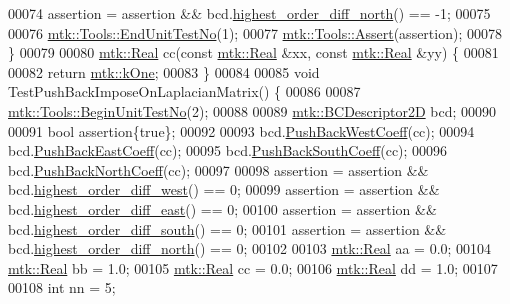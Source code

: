 \begin{DoxyCode}
00074   assertion = assertion && bcd.\hyperlink{classmtk_1_1BCDescriptor2D_a87c5f2449247d65ea07784ba2ec61bc7}{highest\_order\_diff\_north}() == -1;
00075 
00076   \hyperlink{classmtk_1_1Tools_aba67d9dc35c9c1c49430fcc9ea035e03}{mtk::Tools::EndUnitTestNo}(1);
00077   \hyperlink{classmtk_1_1Tools_ac6804df469c94ab6a796fb64f1e44a89}{mtk::Tools::Assert}(assertion);
00078 \}
00079 
00080 \hyperlink{group__c01-roots_gac080bbbf5cbb5502c9f00405f894857d}{mtk::Real} cc(\textcolor{keyword}{const} \hyperlink{group__c01-roots_gac080bbbf5cbb5502c9f00405f894857d}{mtk::Real} &xx, \textcolor{keyword}{const} \hyperlink{group__c01-roots_gac080bbbf5cbb5502c9f00405f894857d}{mtk::Real} &yy) \{
00081 
00082   \textcolor{keywordflow}{return} \hyperlink{group__c01-roots_ga26407c24d43b6b95480943340d285c71}{mtk::kOne};
00083 \}
00084 
00085 \textcolor{keywordtype}{void} TestPushBackImposeOnLaplacianMatrix() \{
00086 
00087   \hyperlink{classmtk_1_1Tools_afc29ecaf337a13ed2e817d3890a5a441}{mtk::Tools::BeginUnitTestNo}(2);
00088 
00089   \hyperlink{classmtk_1_1BCDescriptor2D}{mtk::BCDescriptor2D} bcd;
00090 
00091   \textcolor{keywordtype}{bool} assertion\{\textcolor{keyword}{true}\};
00092 
00093   bcd.\hyperlink{classmtk_1_1BCDescriptor2D_a3da32ba89cfb15032bb1156394bad98c}{PushBackWestCoeff}(cc);
00094   bcd.\hyperlink{classmtk_1_1BCDescriptor2D_a27635428a6c36d1e305cafdc68271063}{PushBackEastCoeff}(cc);
00095   bcd.\hyperlink{classmtk_1_1BCDescriptor2D_a9eb891f14c68968a0113632fa5fea630}{PushBackSouthCoeff}(cc);
00096   bcd.\hyperlink{classmtk_1_1BCDescriptor2D_a0fed58bd058d699a572888fe4b9934a4}{PushBackNorthCoeff}(cc);
00097 
00098   assertion = assertion && bcd.\hyperlink{classmtk_1_1BCDescriptor2D_a0fa469ddf6ff76e2858d6d3b76cc8b6f}{highest\_order\_diff\_west}() == 0;
00099   assertion = assertion && bcd.\hyperlink{classmtk_1_1BCDescriptor2D_a5a9b80a2e9e579b05d9f3589d80448b6}{highest\_order\_diff\_east}() == 0;
00100   assertion = assertion && bcd.\hyperlink{classmtk_1_1BCDescriptor2D_a463d909f6014e7f01b33171a06d7b400}{highest\_order\_diff\_south}() == 0;
00101   assertion = assertion && bcd.\hyperlink{classmtk_1_1BCDescriptor2D_a87c5f2449247d65ea07784ba2ec61bc7}{highest\_order\_diff\_north}() == 0;
00102 
00103   \hyperlink{group__c01-roots_gac080bbbf5cbb5502c9f00405f894857d}{mtk::Real} aa = 0.0;
00104   \hyperlink{group__c01-roots_gac080bbbf5cbb5502c9f00405f894857d}{mtk::Real} bb = 1.0;
00105   \hyperlink{group__c01-roots_gac080bbbf5cbb5502c9f00405f894857d}{mtk::Real} cc = 0.0;
00106   \hyperlink{group__c01-roots_gac080bbbf5cbb5502c9f00405f894857d}{mtk::Real} dd = 1.0;
00107 
00108   \textcolor{keywordtype}{int} nn = 5;

\end{DoxyCode}
